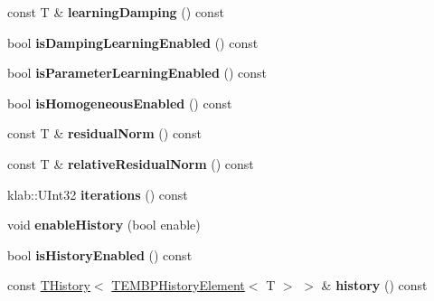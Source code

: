 \begin{DoxyCompactItemize}
\item 
const T \& {\bfseries learning\+Damping} () const \hypertarget{classkl1p_1_1TEMBPSolver_a09a6951ad3608a87b959c22648a92e0f}{}\label{classkl1p_1_1TEMBPSolver_a09a6951ad3608a87b959c22648a92e0f}

\item 
bool {\bfseries is\+Damping\+Learning\+Enabled} () const \hypertarget{classkl1p_1_1TEMBPSolver_a3303dcbc341c1e89f6e95ca9d33903bc}{}\label{classkl1p_1_1TEMBPSolver_a3303dcbc341c1e89f6e95ca9d33903bc}

\item 
bool {\bfseries is\+Parameter\+Learning\+Enabled} () const \hypertarget{classkl1p_1_1TEMBPSolver_a5f9366a2a615867fdd565bdccdcf8cad}{}\label{classkl1p_1_1TEMBPSolver_a5f9366a2a615867fdd565bdccdcf8cad}

\item 
bool {\bfseries is\+Homogeneous\+Enabled} () const \hypertarget{classkl1p_1_1TEMBPSolver_a2dbd29bfa856b783efc610f6a7bd73d1}{}\label{classkl1p_1_1TEMBPSolver_a2dbd29bfa856b783efc610f6a7bd73d1}

\item 
const T \& {\bfseries residual\+Norm} () const \hypertarget{classkl1p_1_1TEMBPSolver_aab34ff0b4faa97da804f1cc18cced983}{}\label{classkl1p_1_1TEMBPSolver_aab34ff0b4faa97da804f1cc18cced983}

\item 
const T \& {\bfseries relative\+Residual\+Norm} () const \hypertarget{classkl1p_1_1TEMBPSolver_ab91e651a140f12f480b7f4875065ccbf}{}\label{classkl1p_1_1TEMBPSolver_ab91e651a140f12f480b7f4875065ccbf}

\item 
klab\+::\+U\+Int32 {\bfseries iterations} () const \hypertarget{classkl1p_1_1TEMBPSolver_a8bd02ae1f6d0c6b3a64ad9072c57f3f3}{}\label{classkl1p_1_1TEMBPSolver_a8bd02ae1f6d0c6b3a64ad9072c57f3f3}

\item 
void {\bfseries enable\+History} (bool enable)\hypertarget{classkl1p_1_1TEMBPSolver_a9f18525ea90d95b2cd18abf8c1d2d35f}{}\label{classkl1p_1_1TEMBPSolver_a9f18525ea90d95b2cd18abf8c1d2d35f}

\item 
bool {\bfseries is\+History\+Enabled} () const \hypertarget{classkl1p_1_1TEMBPSolver_a3587704719ae3e128443cb1211826765}{}\label{classkl1p_1_1TEMBPSolver_a3587704719ae3e128443cb1211826765}

\item 
const \hyperlink{classkl1p_1_1THistory}{T\+History}$<$ \hyperlink{classkl1p_1_1TEMBPHistoryElement}{T\+E\+M\+B\+P\+History\+Element}$<$ T $>$ $>$ \& {\bfseries history} () const \hypertarget{classkl1p_1_1TEMBPSolver_a5c636072b19779ddd69df4f24ff53413}{}\label{classkl1p_1_1TEMBPSolver_a5c636072b19779ddd69df4f24ff53413}


\end{DoxyCompactItemize}
